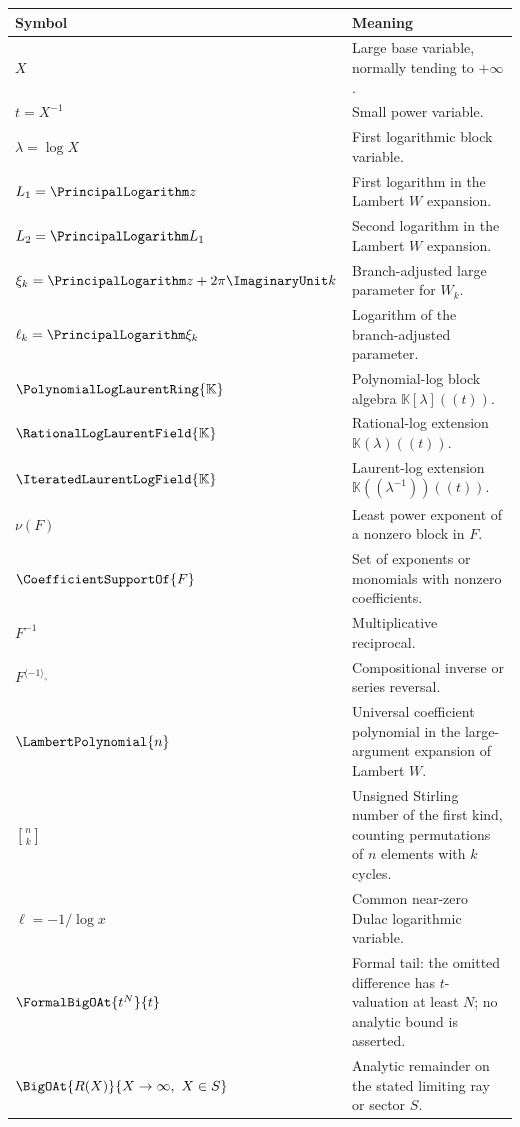 \documentclass[11pt,openany]{book}
\theoremstyle{definition}
\theoremstyle{plain}
\theoremstyle{remark}
\newcommand{\K}{\mathbb{K}}
\newcommand{\Plog}{\PolynomialLogLaurentRing{\K}}
\newcommand{\Rlog}{\RationalLogLaurentField{\K}}
\newcommand{\Hlog}{\IteratedLaurentLogField{\K}}
\newcommand{\invcomp}{^{\langle -1\rangle_{\circ}}}
\newcommand{\stirlingone}[2]{\genfrac{[}{]}{0pt}{}{#1}{#2}}
\newcommand{\val}{\nu}
\begin{document}
\begin{longtable}{@{}p{}p{}@{}}
\toprule
Symbol & Meaning\\
\midrule
\endhead
\(X\) & Large base variable, normally tending to \(+\infty\).\\
\(t=X^{-1}\) & Small power variable.\\
\(\lambda=\log X\) & First logarithmic block variable.\\
\(L_1=\PrincipalLogarithm z\) & First logarithm in the Lambert \(W\) expansion.\\
\(L_2=\PrincipalLogarithm L_1\) & Second logarithm in the Lambert \(W\) expansion.\\
\(\xi_k=\PrincipalLogarithm z+2\pi\ImaginaryUnit k\) & Branch-adjusted large parameter for \(W_k\).\\
\(\ell_k=\PrincipalLogarithm\xi_k\) & Logarithm of the branch-adjusted parameter.\\
\(\Plog\) & Polynomial-log block algebra \(\K[\lambda]((t))\).\\
\(\Rlog\) & Rational-log extension \(\K(\lambda)((t))\).\\
\(\Hlog\) & Laurent-log extension \(\K((\lambda^{-1}))((t))\).\\
\(\val(F)\) & Least power exponent of a nonzero block in \(F\).\\
\(\CoefficientSupportOf{F}\) & Set of exponents or monomials with nonzero coefficients.\\
\(F^{-1}\) & Multiplicative reciprocal.\\
\(F\invcomp\) & Compositional inverse or series reversal.\\
\(\LambertPolynomial{n}\) & Universal coefficient polynomial in the large-argument expansion of Lambert \(W\).\\
\(\stirlingone{n}{k}\) & Unsigned Stirling number of the first kind, counting permutations of \(n\) elements with \(k\) cycles.\\
\(\ell=-1/\log x\) & Common near-zero Dulac logarithmic variable.\\
\(\FormalBigOAt{t^N}{t}\) & Formal tail: the omitted difference has \(t\)-valuation at least \(N\); no analytic bound is asserted.\\
\(\BigOAt{R(X)}{X\to\infty,\ X\in S}\) & Analytic remainder on the stated limiting ray or sector \(S\).\\
\bottomrule
\end{longtable}

\end{document}
